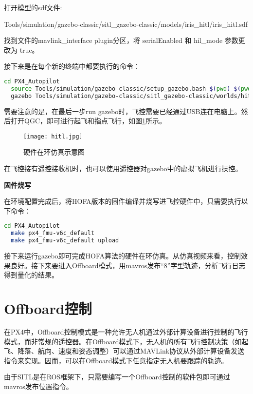 打开模型的sdf文件:

Tools/simulation/gazebo-classic/sitl\_gazebo-classic/models/iris\_hitl/iris\_hitl.sdf

找到文件的mavlink\_interface plugin分区，将 serialEnabled 和 hil\_mode 参数更改为 true。

接下来是在每个新的终端中都要执行的命令：

\begin{lstlisting}[language=Bash, basicstyle=\footnotesize, linewidth=\linewidth, breaklines=true]
  cd PX4_Autopilot
  source Tools/simulation/gazebo-classic/setup_gazebo.bash $(pwd) $(pwd)/build/px4_sitl_default
  gazebo Tools/simulation/gazebo-classic/sitl_gazebo-classic/worlds/hitl_iris.world
\end{lstlisting}


需要注意的是，在最后一步run gazebo时，飞控需要已经通过USB连在电脑上。然后打开QGC，即可进行起飞和指点飞行，如图\ref{hitl}所示。
\begin{figure}[!h]
  \centering
  \texttt{[image: hitl.jpg]}
  \caption{硬件在环仿真示意图}
  \label{hitl}
\end{figure}

在飞控接有遥控接收机时，也可以使用遥控器对gazebo中的虚拟飞机进行操控。

\textbf{固件烧写}

在环境配置完成后，将HOFA版本的固件编译并烧写进飞控硬件中，只需要执行以下命令：

\begin{lstlisting}[language=Bash, basicstyle=\footnotesize, linewidth=\linewidth, breaklines=true]
  cd PX4_Autopilot
  make px4_fmu-v6c_default
  make px4_fmu-v6c_default upload
\end{lstlisting}

接下来运行gazebo即可完成HOFA算法的硬件在环仿真。从仿真视频来看，控制效果良好。接下来要进入Offboard模式，用mavros发布“8”字型轨迹，分析飞行日志得到量化的结果。

\section{Offboard控制}

在PX4中，Offboard控制模式是一种允许无人机通过外部计算设备进行控制的飞行模式，而非常规的遥控器。在Offboard模式下，无人机的所有飞行控制决策（如起飞、降落、航向、速度和姿态调整）可以通过MAVLink协议从外部计算设备发送指令来实现。因而，可以在Offboard模式下任意指定无人机要跟踪的轨迹。

由于SITL是在ROS框架下，只需要编写一个Offboard控制的软件包即可通过mavros发布位置指令。

